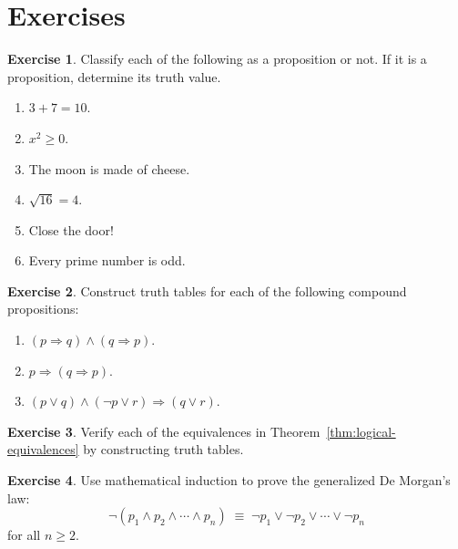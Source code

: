 \documentclass[12pt,a4paper,openany]{book}
\theoremstyle{definition}
\newtheorem{exercise}{Exercise}[chapter]
\theoremstyle{plain}
\theoremstyle{remark}
\begin{document}
\section{Exercises}
\label{sec:exercises-ch1}

\begin{exercise}
\label{exer:classify-propositions}
Classify each of the following as a proposition or not. If it is a proposition,
determine its truth value.
\begin{enumerate}[label=(\alph*),nosep]
  \item $3 + 7 = 10$.
  \item $x^2 \geq 0$.
  \item The moon is made of cheese.
  \item $\sqrt{16} = 4$.
  \item Close the door!
  \item Every prime number is odd.
\end{enumerate}
\end{exercise}

\begin{exercise}
\label{exer:truth-tables}
Construct truth tables for each of the following compound propositions:
\begin{enumerate}[label=(\alph*),nosep]
  \item $(p \Rightarrow q) \land (q \Rightarrow p)$.
  \item $p \Rightarrow (q \Rightarrow p)$.
  \item $(p \lor q) \land (\lnot p \lor r) \Rightarrow (q \lor r)$.
\end{enumerate}
\end{exercise}

\begin{exercise}
\label{exer:verify-equivalences}
Verify each of the equivalences in Theorem~\ref{thm:logical-equivalences}
by constructing truth tables.
\end{exercise}

\begin{exercise}
\label{exer:demorgan-generalized}
Use mathematical induction to prove the generalized De Morgan's law:
\[
  \lnot(p_1 \land p_2 \land \cdots \land p_n)
  \;\equiv\;
  \lnot p_1 \lor \lnot p_2 \lor \cdots \lor \lnot p_n
\]
for all $n \geq 2$.
\end{exercise}
\end{document}
